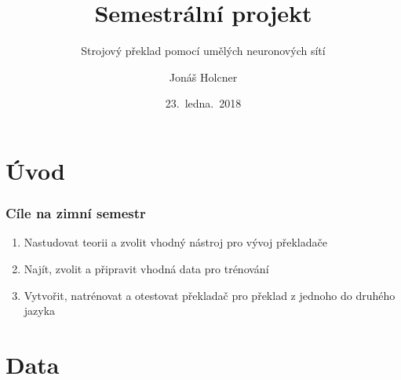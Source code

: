 \documentclass[pdf,fyma2]{beamer}
\title{Semestrální projekt}
\subtitle{Strojový překlad pomocí umělých neuronových sítí}
\author{Jonáš Holcner}
\institute[VUT FIT]{Vedoucí: Ing. Igor Szőke, Ph.D.}
\date{23.~ledna.~2018}
\begin{document}
\maketitle

\section{Úvod}

\begin{frame}
\frametitle{Cíle na zimní semestr}
    \begin{enumerate}
          \item Nastudovat teorii a zvolit vhodný nástroj pro vývoj překladače
          \item Najít, zvolit a připravit vhodná data pro trénování
          \item Vytvořit, natrénovat a otestovat překladač pro překlad z jednoho do druhého jazyka
    \end{enumerate}
\end{frame}

\section{Data}
\end{document}
